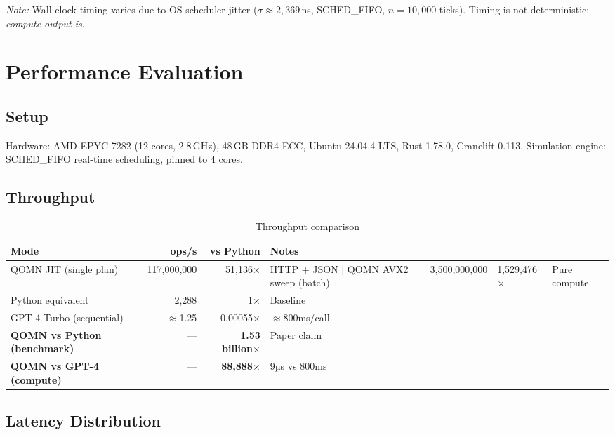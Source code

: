 \documentclass[11pt]{article}
\begin{document}
\textit{Note:} Wall-clock timing varies due to OS scheduler jitter
($\sigma \approx 2{,}369$\,ns, SCHED\_FIFO, $n = 10{,}000$ ticks).
Timing is not deterministic; \emph{compute output is}.

\section{Performance Evaluation}

\subsection{Setup}

Hardware: AMD EPYC 7282 (12 cores, 2.8\,GHz), 48\,GB DDR4 ECC,
Ubuntu 24.04.4 LTS, Rust 1.78.0, Cranelift 0.113.
Simulation engine: SCHED\_FIFO real-time scheduling, pinned to 4 cores.

\subsection{Throughput}

\begin{table}[h]
\centering
\caption{Throughput comparison}
\label{tab:throughput}
\begin{tabular}{lrrl}
\toprule
\textbf{Mode} & \textbf{ops/s} & \textbf{vs Python} & \textbf{Notes} \\
\midrule
QOMN JIT (single plan)   & 117,000,000 & 51,136$\times$      & HTTP + JSON |
QOMN AVX2 sweep (batch)  & 3,500,000,000 & 1,529,476$\times$ & Pure compute \\
Python equivalent           & 2,288        & 1$\times$           & Baseline \\
GPT-4 Turbo (sequential)   & $\approx$1.25 & 0.00055$\times$   & $\approx$800ms/call \\
\midrule
\textbf{QOMN vs Python (benchmark)} & — & \textbf{1.53 billion$\times$} & Paper claim \\
\textbf{QOMN vs GPT-4 (compute)} & — & \textbf{88,888$\times$} & 9µs vs 800ms \\
\bottomrule
\end{tabular}
\end{table}

\subsection{Latency Distribution}
\end{document}
